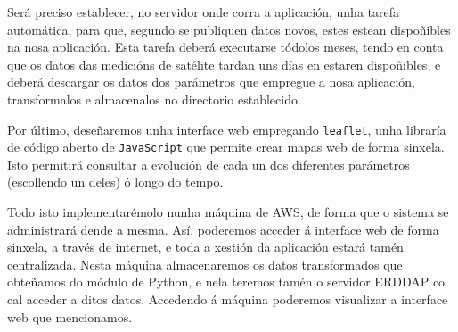 Será preciso establecer, no servidor onde corra a aplicación, unha tarefa automática, para que, segundo se publiquen datos novos, estes estean dispoñibles na nosa aplicación. Esta tarefa
deberá executarse tódolos meses, tendo en conta que os datos das medicións de satélite tardan uns días en estaren dispoñibles, e deberá descargar os datos dos parámetros que empregue a
nosa aplicación, transformalos e almacenalos no directorio establecido.

Por último, deseñaremos unha interface web empregando \texttt{leaflet}, unha libraría de código aberto de \texttt{JavaScript} que permite crear mapas web de forma sinxela. Isto
permitirá consultar a evolución de cada un dos diferentes parámetros (escollendo un deles) ó longo do tempo.

Todo isto implementarémolo nunha máquina de AWS, de forma que o sistema se administrará dende a mesma. Así, poderemos acceder á interface web de forma sinxela, a través de internet,
e toda a xestión da aplicación estará tamén centralizada. Nesta máquina almacenaremos os datos transformados que obteñamos do módulo de Python, e nela teremos tamén o servidor ERDDAP
co cal acceder a ditos datos. Accedendo á máquina poderemos visualizar a interface web que mencionamos.
